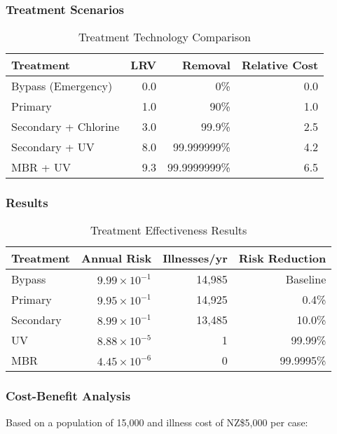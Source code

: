 \documentclass[11pt,a4paper]{article}
\begin{document}
\subsubsection{Treatment Scenarios}

\begin{table}[H]
\centering
\caption{Treatment Technology Comparison}
\begin{tabular}{lrrr}
\toprule
\textbf{Treatment} & \textbf{LRV} & \textbf{Removal} & \textbf{Relative Cost} \\
\midrule
Bypass (Emergency) & 0.0 & 0\% & 0.0 \\
Primary & 1.0 & 90\% & 1.0 \\
Secondary + Chlorine & 3.0 & 99.9\% & 2.5 \\
Secondary + UV & 8.0 & 99.999999\% & 4.2 \\
MBR + UV & 9.3 & 99.9999999\% & 6.5 \\
\bottomrule
\end{tabular}
\end{table}

\subsubsection{Results}

\begin{table}[H]
\centering
\caption{Treatment Effectiveness Results}
\begin{tabular}{lrrr}
\toprule
\textbf{Treatment} & \textbf{Annual Risk} & \textbf{Illnesses/yr} & \textbf{Risk Reduction} \\
\midrule
Bypass & $9.99 \times 10^{-1}$ & 14,985 & Baseline \\
Primary & $9.95 \times 10^{-1}$ & 14,925 & 0.4\% \\
Secondary & $8.99 \times 10^{-1}$ & 13,485 & 10.0\% \\
UV & $8.88 \times 10^{-5}$ & 1 & 99.99\% \\
MBR & $4.45 \times 10^{-6}$ & 0 & 99.9995\% \\
\bottomrule
\end{tabular}
\end{table}

\subsubsection{Cost-Benefit Analysis}

Based on a population of 15,000 and illness cost of NZ\$5,000 per case:
\end{document}
